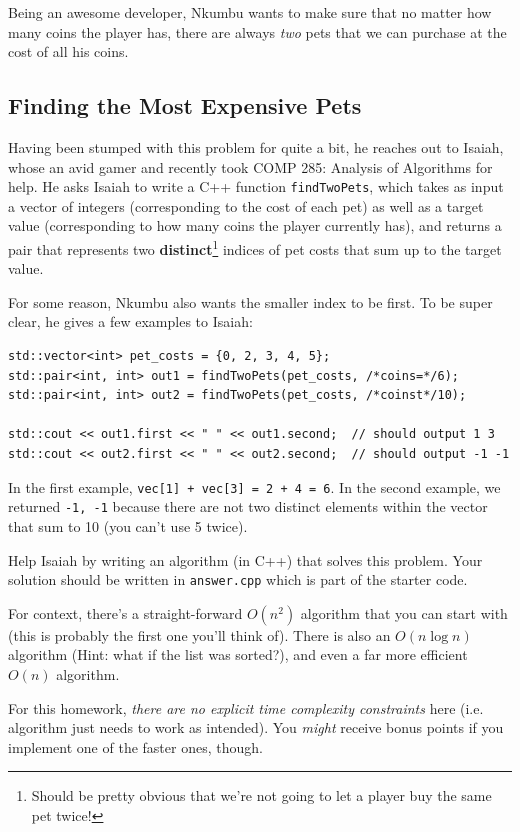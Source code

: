 \documentclass [12pt]{article}
\begin{document}
Being an awesome developer, Nkumbu wants to make sure that no matter how many coins the player has, there are always \textit{two} pets that we can purchase at the cost of all his coins.


\subsection{Finding the Most Expensive Pets}
 Having been stumped with this problem for quite a bit, he reaches out to Isaiah, whose an avid gamer and recently took COMP 285: Analysis of Algorithms for help. He asks Isaiah to write a C++ function \texttt{findTwoPets}, which takes as input a vector of integers (corresponding to the cost of each pet) as well as a target value (corresponding to how many coins the player currently has), and returns a pair that represents two \textbf{distinct}\footnote{Should be pretty obvious that we're not going to let a player buy the same pet twice!} indices of pet costs that sum up to the target value.

For some reason, Nkumbu also wants the smaller index to be first. To be super clear, he gives a few examples to Isaiah:

\vspace{2em}
\begin{verbatim}
std::vector<int> pet_costs = {0, 2, 3, 4, 5};
std::pair<int, int> out1 = findTwoPets(pet_costs, /*coins=*/6);
std::pair<int, int> out2 = findTwoPets(pet_costs, /*coinst*/10);

std::cout << out1.first << " " << out1.second;  // should output 1 3
std::cout << out2.first << " " << out2.second;  // should output -1 -1
\end{verbatim}

In the first example, \texttt{vec[1] + vec[3] = 2 + 4 = 6}. In the second example, we returned \texttt{-1, -1} because there are not two distinct elements within the vector that sum to 10 (you can't use 5 twice).

Help Isaiah by writing an algorithm (in C++) that solves this problem. Your solution should be written in \texttt{answer.cpp} which is part of the starter code. 

For context, there's a straight-forward $O(n^2)$ algorithm that you can start with (this is probably the first one you'll think of). There is also an $O(n \log n)$ algorithm (Hint: what if the list was sorted?), and even a far more efficient $O(n)$ algorithm.

For this homework, \textit{there are no explicit time complexity constraints} here (i.e. algorithm just needs to work as intended). You \textit{might} receive bonus points if you implement one of the faster ones, though. 
\end{document}
